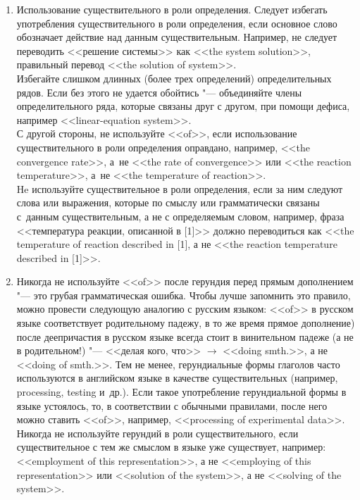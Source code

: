 \documentclass[a5paper, 10pt, twoside, numbers=enddot]{scrartcl}
\newcommand{\etal}{и~др.\xspace}
\begin{document}
\begin{enumerate}
  \item Использование существительного в роли определения. Следует избегать употребления
    существительного в роли определения, если основное слово  обозначает действие над данным
    существительным. Например, не следует переводить <<решение системы>> как <<the system
    solution>>, правильный перевод <<the solution of system>>.\\ [4pt]
    Избегайте слишком длинных (более трех определений) определительных рядов. Если без этого не
    удается обойтись "--- объединяйте члены определительного ряда, которые связаны друг с другом,
    при помощи дефиса, например <<linear-equation system>>.\\ [4pt]
    С другой стороны, не используйте <<of>>, если использование существительного в роли определения
    оправдано, например, <<the convergence rate>>, а~не <<the rate of convergence>> или <<the
    reaction temperature>>, а~не <<the tem\-perature of reaction>>.\\ [4pt]
    He используйте существительное в роли определения, если за ним следуют слова или выражения,
    которые по смыслу или грамматически связаны с~данным существительным, а не с определяемым
    словом, например, фраза <<температура реакции, описанной в [1]>> должно переводиться как <<the
    temperature of reaction described in [1], а не <<the reaction temperature described in [1]>>.

  \item Никогда не используйте <<of>> после герундия перед прямым дополнением "--- это грубая
    грамматическая ошибка. Чтобы лучше запомнить это правило, можно провести следующую аналогию с
    русским языком: <<of>> в русском языке соответствует родительному падежу, в то же время прямое
    дополнение) после деепричастия в русском языке всегда стоит в винительном падеже (а не в
    родительном!) "--- <<делая кого, что>> $\rightarrow$ <<doing smth.>>, а не <<doing of smth.>>.
    Тем не менее, герундиальные формы глаголов часто используются в английском языке в качестве
    существительных (например, processing, testing \etal). Если такое употребление герундиальной
    формы в языке устоялось, то, в  соответствии с обычными правилами, после него можно ставить
    <<of>>, например, <<processing of experimental data>>.\\ [4pt]
    Никогда не используйте герундий в роли существительного, если существительное с тем же смыслом в
    языке уже существует, например: <<employment of this representation>>, а не <<employing of this
    representation>> или <<solution of the system>>, а не <<solving of the system>>.


\end{enumerate}
\end{document}
